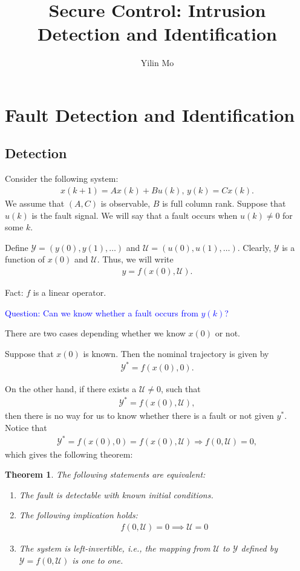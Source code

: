 \documentclass{article}
\title{Secure Control: Intrusion Detection and Identification}
\author{Yilin Mo}
\newtheorem{theorem}{Theorem}
\newcommand{\y}{{\mathcal Y}}
\renewcommand{\u}{{\mathcal U}}
\newcommand{\comment}[1]{\textcolor{blue}{#1}}
\newcommand{\comment}[1]{}
\begin{document}
 \maketitle
\section{Fault Detection and Identification}
\subsection{Detection}
Consider the following system:
\begin{align}
  x(k+1) = A x(k) + B u(k),\, y(k) = C x(k).
  \label{eq:ltisystem1}
\end{align}
We assume that $(A,C)$ is observable, $B$ is full column rank. Suppose that $u(k)$ is the fault signal. We will say that a fault occurs when $u(k) \neq 0$ for some $k$.

Define $\y = (y(0),y(1),\dots)$ and $\u = (u(0),u(1),\dots)$. Clearly, $\y$ is a function of $x(0)$ and $\u$. Thus, we will write
\begin{align*}
 y = f(x(0),\u). 
\end{align*}

Fact: $f$ is a linear operator.

\comment{Question: Can we know whether a fault occurs from $y(k)$?}

There are two cases depending whether we know $x(0)$ or not. 

Suppose that $x(0)$ is known. Then the nominal trajectory is given by
\begin{align*}
 \y^* = f(x(0),0). 
\end{align*}

On the other hand, if there exists a $\u\neq 0$, such that 
\begin{align*}
 \y^* = f(x(0),\u), 
\end{align*}
then there is no way for us to know whether there is a fault or not given $y^*$. Notice that
\begin{align*}
 \y^* = f(x(0),0) = f(x(0),\u) \Rightarrow f(0,\u) = 0,
\end{align*}
which gives the following theorem:
\begin{theorem}
  The following statements are equivalent:
  \begin{enumerate}
    \item The fault is detectable with known initial conditions. 
    \item The following implication holds:
      \begin{align*}
	f(0,\u)=0\implies \u=0
      \end{align*}
    \item The system is left-invertible, i.e., the mapping from $\u$ to $\y$ defined by $\y = f(0,\u)$ is one to one.
  \end{enumerate}
  \label{eq:detectabilityknowninit}
\end{theorem}
\end{document}
